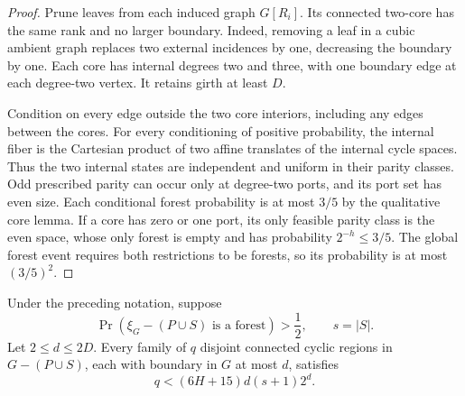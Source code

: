 \begin{proof}
Prune leaves from each induced graph $G[R_i]$.
Its connected two-core has the same rank and no larger boundary.
Indeed, removing a leaf in a cubic ambient graph replaces two external incidences by one, decreasing the boundary by one.
Each core has internal degrees two and three, with one boundary edge at each degree-two vertex.
It retains girth at least $D$.

Condition on every edge outside the two core interiors, including any edges between the cores.
For every conditioning of positive probability, the internal fiber is the Cartesian product of two affine translates of the internal cycle spaces.
Thus the two internal states are independent and uniform in their parity classes.
Odd prescribed parity can occur only at degree-two ports, and its port set has even size.
Each conditional forest probability is at most $3/5$ by the qualitative core lemma.
If a core has zero or one port, its only feasible parity class is the even space, whose only forest is empty and has probability $2^{-h}\le3/5$.
The global forest event requires both restrictions to be forests, so its probability is at most $(3/5)^2$.
\end{proof}

\begin{proposition}
\label{prop:four-packing-after-deletion}
Under the preceding notation, suppose
\[
 \Pr(\xi_G-(P\cup S)\text{ is a forest})>\frac12,
 \qquad s=|S|.
\]
Let $2\le d\le2D$.
Every family of $q$ disjoint connected cyclic regions in $G-(P\cup S)$, each with boundary in $G$ at most $d$, satisfies
\[
 q<(6H+15)d(s+1)2^d.
\]
\end{proposition}

